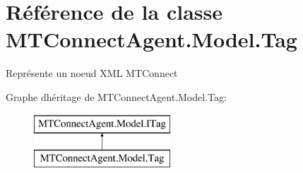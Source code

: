 \hypertarget{class_m_t_connect_agent_1_1_model_1_1_tag}{}\section{Référence de la classe M\+T\+Connect\+Agent.\+Model.\+Tag}
\label{class_m_t_connect_agent_1_1_model_1_1_tag}


Représente un noeud X\+ML M\+T\+Connect  


Graphe d\textquotesingle{}héritage de M\+T\+Connect\+Agent.\+Model.\+Tag\+:\begin{figure}[H]
\begin{center}
\leavevmode
\includegraphics[height=2.000000cm]{class_m_t_connect_agent_1_1_model_1_1_tag}
\end{center}
\end{figure}
